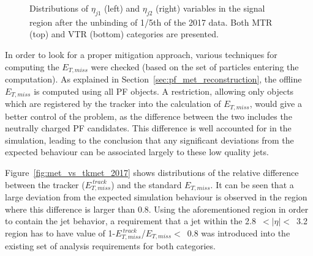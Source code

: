 \begin{figure}[htbp]
{    }
  \caption{Distributions of $\eta_{j1}$ (left) and $\eta_{j2}$ (right) variables in the signal region after the unbinding of 1/5th of the 2017 data. Both MTR (top) and VTR (bottom) categories are presented.}
  \label{fig:jet_eta_preHornCut}
\end{figure}




\hspace{10pt} In order to look for a proper mitigation approach, various techniques for computing the $E_{T, miss}$ were checked (based on the set of particles entering the computation). As explained in Section~\ref{sec:pf_met_reconstruction}, the offline $E_{T,miss}$ is computed using all PF objects. A restriction, allowing only objects which are registered by the tracker into the calculation of $E_{T,miss}$, would give a better control of the problem, as the difference between the two includes the neutrally charged PF candidates. This difference is well accounted for in the simulation, leading to the conclusion that any significant deviations from the expected behaviour can be associated largely to these low quality jets.

\hspace{10pt} Figure~\ref{fig:met_vs_tkmet_2017} shows distributions of the relative difference between the tracker ($E_{T,miss}^{~track}$) and the standard $E_{T, miss}$. It can be seen that a large deviation from the expected simulation behaviour is observed in the region where this difference is larger than 0.8. Using the aforementioned region in order to contain the jet behavior, a requirement that a jet within the 2.8~$<|\eta|<$~3.2 region has to have value of 1-$E_{T,miss}^{~track}$/$E_{T, miss}<$~0.8  was introduced into the existing set of analysis requirements for both categories.

